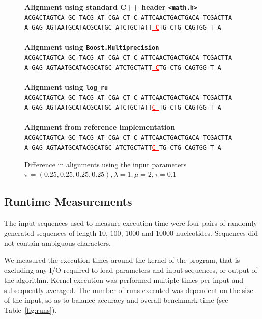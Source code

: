 \documentclass{article}
\begin{document}
\begin{figure}

\textbf{Alignment using standard C++ header \texttt{<math.h>}}
~
\\
\texttt{ACGACTAGTCA-GC-TACG-AT-CGA-CT-C-ATTCAACTGACTGACA-TCGACTTA} \\
\texttt{A-GAG-AGTAATGCATACGCATGC-ATCTGCTATT\textcolor{red}{\underline{---C}}TG-CTG-CAGTGG--T-A}
\\~\\
\textbf{Alignment using \texttt{Boost.Multiprecision}}
~
\\
\texttt{ACGACTAGTCA-GC-TACG-AT-CGA-CT-C-ATTCAACTGACTGACA-TCGACTTA} \\
\texttt{A-GAG-AGTAATGCATACGCATGC-ATCTGCTATT\textcolor{red}{\underline{---C}}TG-CTG-CAGTGG--T-A}
\\~\\
\textbf{Alignment using \texttt{log\_ru}}
~
\\
\texttt{ACGACTAGTCA-GC-TACG-AT-CGA-CT-C-ATTCAACTGACTGACA-TCGACTTA} \\
\texttt{A-GAG-AGTAATGCATACGCATGC-ATCTGCTATT\textcolor{red}{\underline{C---}}TG-CTG-CAGTGG--T-A}
\\~\\
\textbf{Alignment from reference implementation}
~
\\
\texttt{ACGACTAGTCA-GC-TACG-AT-CGA-CT-C-ATTCAACTGACTGACA-TCGACTTA} \\
\texttt{A-GAG-AGTAATGCATACGCATGC-ATCTGCTATT\textcolor{red}{\underline{C---}}TG-CTG-CAGTGG--T-A}

\caption{Difference in alignments using the input parameters $\pi=(0.25,0.25,0.25,0.25), \lambda=1, \mu = 2, \tau = 0.1$}
\label{fig:alignments}
\end{figure}

\subsection{Runtime Measurements}

The input sequences used to measure execution time were four pairs of randomly generated sequences of length $10$, $100$, $1000$ and $10000$ nucleotides. Sequences did not contain ambiguous characters. 

We measured the execution times around the kernel of the program, that is excluding any I/O required to load parameters and input sequences, or output of the algorithm. Kernel execution was performed multiple times per input and subsequently averaged. The number of runs executed was dependent on the size of the input, so as to balance accuracy and overall benchmark time (see Table~\ref{fig:runs}). 
\end{document}
